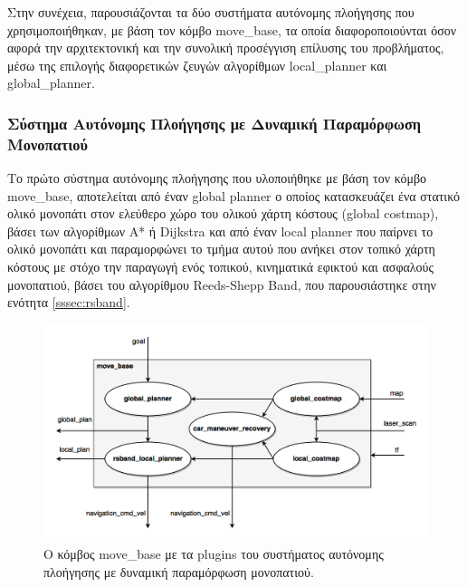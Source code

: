 \bigskip
Στην συνέχεια, παρουσιάζονται τα δύο συστήματα αυτόνομης πλοήγησης που χρησιμοποιήθηκαν, με βάση τον κόμβο move{\_}base, τα οποία διαφοροποιούνται όσον αφορά την αρχιτεκτονική και την συνολική προσέγγιση επίλυσης του προβλήματος, μέσω της επιλογής διαφορετικών ζευγών αλγορίθμων local{\_}planner και global{\_}planner.
	
\subsubsection{Σύστημα Αυτόνομης Πλοήγησης με Δυναμική Παραμόρφωση Μονοπατιού}
Το πρώτο σύστημα αυτόνομης πλοήγησης που υλοποιήθηκε με βάση τον κόμβο move{\_}base, αποτελείται από έναν global planner ο οποίος κατασκευάζει ένα στατικό ολικό μονοπάτι στον ελεύθερο χώρο του ολικού χάρτη κόστους (global costmap), βάσει των αλγορίθμων A* ή Dijkstra και από έναν local planner που παίρνει το ολικό μονοπάτι και παραμορφώνει το τμήμα αυτού που ανήκει στον τοπικό χάρτη κόστους με στόχο την παραγωγή ενός τοπικού, κινηματικά εφικτού και ασφαλούς μονοπατιού, βάσει του αλγορίθμου Reeds-Shepp Band, που παρουσιάστηκε στην ενότητα \ref{sssec:rsband}.

\begin{figure}[!ht]
	\centering
	\includegraphics[width=\linewidth]{Chapters/Chapter4/Figures/navigation_1_plugins.png}
	\caption{Ο κόμβος move{\_}base με τα plugins του συστήματος αυτόνομης πλοήγησης με δυναμική παραμόρφωση μονοπατιού.}
	\label{fig:navigation_1_plugins}
\end{figure}

